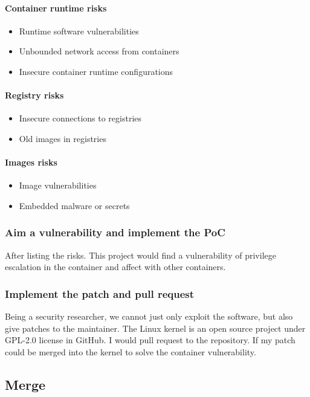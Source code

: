 \documentclass[12pt,a4paper,oneside]{IEEEconf}
\begin{document}
\paragraph{Container runtime risks}
\begin{itemize}
  \item Runtime software vulnerabilities
  \item Unbounded network access from containers
  \item Insecure container runtime configurations
\end{itemize}

\paragraph{Registry risks}
\begin{itemize}
  \item Insecure connections to registries
  \item Old images in registries
\end{itemize}

\paragraph{Images risks}
\begin{itemize}
  \item Image vulnerabilities
  \item Embedded malware or secrets
\end{itemize}

\subsubsection{Aim a vulnerability and implement the PoC}
After listing the risks. This project would find a vulnerability of privilege escalation in
the container and affect with other containers.

\subsubsection{Implement the patch and pull request}
Being a security researcher, we cannot just only exploit the software, but also give patches to
the maintainer. The Linux kernel is an open source project under GPL-2.0 license in GitHub.
I would pull request to the repository. If my patch could be merged into the kernel to solve the
container vulnerability.

\subsection{Merge}
\end{document}
